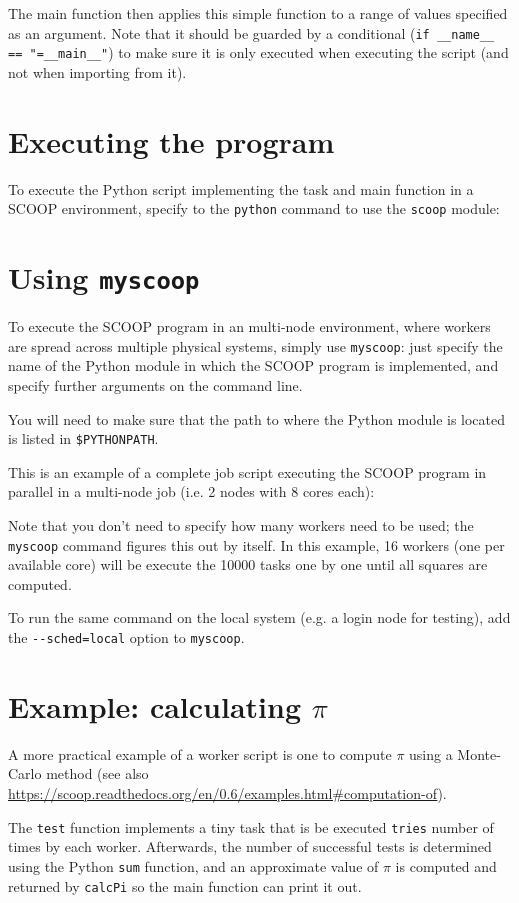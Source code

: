 The main function then applies this simple function to a range of values specified as an argument.
Note that it should be guarded by a conditional (\lstinline|if __name__ == "=__main__"|) to make sure it is only executed
when executing the script (and not when importing from it).

\section{Executing the program}

To execute the Python script implementing the task and main function in a SCOOP environment,
specify to the \lstinline|python| command to use the \lstinline|scoop| module:

\begin{prompt}
\end{prompt}


\section{Using \texttt{myscoop}}

To execute the SCOOP program in an multi-node environment, where workers are spread
across multiple physical systems, simply use \lstinline|myscoop|: just specify the
name of the Python module in which the SCOOP program is implemented, and specify
further arguments on the command line.

You will need to make sure that the path to where the Python module is located is listed in \lstinline|$PYTHONPATH|.

This is an example of a complete job script executing the SCOOP program in parallel
in a multi-node job (i.e. 2 nodes with 8 cores each):


Note that you don't need to specify how many workers need to be used; the \lstinline|myscoop|
command figures this out by itself. In this example, 16 workers (one per available core) will be
execute the 10000 tasks one by one until all squares are computed.

To run the same command on the local system (e.g. a login node for testing), add
the \lstinline|--sched=local| option to \lstinline|myscoop|.

\section{Example: calculating $\pi$}

A more practical example of a worker script is one to compute $\pi$ using a
Monte-Carlo method (see also \url{https://scoop.readthedocs.org/en/0.6/examples.html#computation-of}).

The \lstinline|test| function implements a tiny task that is be executed \lstinline|tries| number of times by
each worker.
Afterwards, the number of successful tests is determined using the Python \lstinline|sum| function,
and an approximate value of $\pi$ is computed and returned by \lstinline|calcPi| so the main function can print it out.


